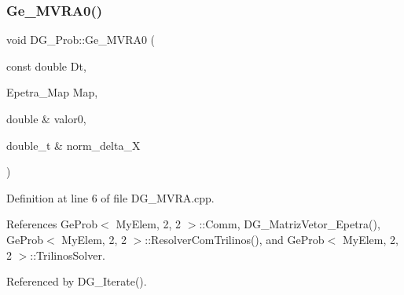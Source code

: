 \subsubsection{\texorpdfstring{Ge\+\_\+\+M\+V\+R\+A0()}{Ge\_MVRA0()}}
{\footnotesize\ttfamily void D\+G\+\_\+\+Prob\+::\+Ge\+\_\+\+M\+V\+R\+A0 (\begin{DoxyParamCaption}\item[{const double}]{Dt,  }\item[{Epetra\+\_\+\+Map}]{Map,  }\item[{double \&}]{valor0,  }\item[{double\+\_\+t \&}]{norm\+\_\+delta\+\_\+X }\end{DoxyParamCaption})}



Definition at line 6 of file D\+G\+\_\+\+M\+V\+R\+A.\+cpp.



References Ge\+Prob$<$ My\+Elem, 2, 2 $>$\+::\+Comm, D\+G\+\_\+\+Matriz\+Vetor\+\_\+\+Epetra(), Ge\+Prob$<$ My\+Elem, 2, 2 $>$\+::\+Resolver\+Com\+Trilinos(), and Ge\+Prob$<$ My\+Elem, 2, 2 $>$\+::\+Trilinos\+Solver.



Referenced by D\+G\+\_\+\+Iterate().

